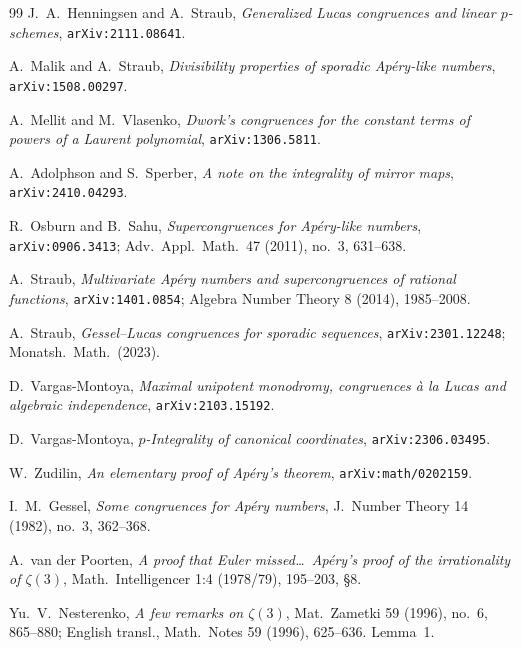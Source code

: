 \begin{thebibliography}{99}
J.~A.~Henningsen and A.~Straub,
\emph{Generalized Lucas congruences and linear $p$-schemes},
\texttt{arXiv:2111.08641}.

A.~Malik and A.~Straub,
\emph{Divisibility properties of sporadic Ap\'ery-like numbers},
\texttt{arXiv:1508.00297}.

A.~Mellit and M.~Vlasenko,
\emph{Dwork's congruences for the constant terms of powers of a Laurent polynomial},
\texttt{arXiv:1306.5811}.

A.~Adolphson and S.~Sperber,
\emph{A note on the integrality of mirror maps},
\texttt{arXiv:2410.04293}.

R.~Osburn and B.~Sahu,
\emph{Supercongruences for Ap\'ery-like numbers},
\texttt{arXiv:0906.3413}; Adv.\ Appl.\ Math.\ 47 (2011), no.~3, 631--638.

A.~Straub,
\emph{Multivariate Ap\'ery numbers and supercongruences of rational functions},
\texttt{arXiv:1401.0854}; Algebra Number Theory 8 (2014), 1985--2008.

A.~Straub,
\emph{Gessel--Lucas congruences for sporadic sequences},
\texttt{arXiv:2301.12248}; Monatsh.\ Math.\ (2023).

D.~Vargas-Montoya,
\emph{Maximal unipotent monodromy, congruences \`a la Lucas and algebraic independence},
\texttt{arXiv:2103.15192}.

D.~Vargas-Montoya,
\emph{$p$-Integrality of canonical coordinates},
\texttt{arXiv:2306.03495}.

W.~Zudilin,
\emph{An elementary proof of Ap\'ery's theorem},
\texttt{arXiv:math/0202159}.


I.~M.~Gessel,
\emph{Some congruences for Ap\'ery numbers},
J.\ Number Theory 14 (1982), no.~3, 362--368.

A.~van der Poorten,
\emph{A proof that Euler missed\dots\ Ap\'ery's proof of the irrationality of $\zeta(3)$},
Math.\ Intelligencer 1:4 (1978/79), 195--203, \S8.

Yu.~V.~Nesterenko,
\emph{A few remarks on $\zeta(3)$},
Mat.\ Zametki 59 (1996), no.~6, 865--880;
English transl., Math.\ Notes 59 (1996), 625--636. Lemma~1.


\end{thebibliography}
